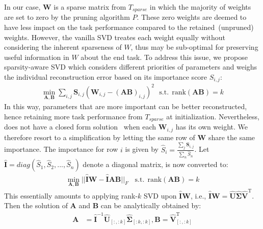 In our case, $\bm{W}$ is a sparse matrix from $T_{sparse}$ in which the majority of weights are set to zero by the pruning algorithm $P$. These zero weights are deemed to have less impact on the task performance compared to the retained~(unpruned) weights. However, the vanilla SVD treates each weight equally without considering the inherent sparseness of $W$, thus may be sub-optimal for preserving useful information in $W$ about the end task.
To address this issue, we propose sparsity-aware SVD which considers different priorities of parameters and weighs the individual reconstruction error based on its importance score $S_{i,j}$:
\begin{align}
	\min_{\bm{A},\bm{B}}\sum_{i,j}\bm{S}_{i,j}(\bm{W}_{i,j}-(\bm{AB})_{i,j})^2~~~\text{s.t.}~~\text{rank}(\bm{AB})=k
	\label{eq:sasvd}
\end{align}
In this way, parameters that are more important can be better reconstructed, hence retaining more task performance from $T_{sparse}$ at initialization. Nevertheless,  does not have a closed form solution~\cite{weightedsvd,hsu2021language} when each $\bm{W}_{i,j}$ has its own weight. We therefore resort to a simplification by letting the same row of $\bm{W}$ share the same importance. The importance for row $i$ is given by $\hat{S}_{i}=\frac{\sum_{j}\bm{S}_{i,j}}{\sum_{n}\hat{S}_{n}}$. Let $\hat{\bm{I}}=diag(\hat{S}_1,\hat{S}_2,...,\hat{S}_{n})$ denote a diagonal matrix,   is now converted to:
\begin{align}
	\min_{\bm{A},\bm{B}}||\hat{\bm{I}}\bm{W}-\hat{\bm{I}}\bm{A}\bm{B}||_F~~~~\text{s.t.}~~\text{rank}(\bm{AB})=k
\end{align}
This essentially amounts to applying rank-$k$ SVD upon $\hat{\bm{I}}\bm{W}$, i.e., $\hat{\bm{I}}\bm{W}=\hat{\bm{U}}\hat{\bm{\Sigma}}\hat{\bm{V}}^\mathrm{T}$. Then the solution of $\bm{A}$ and $\bm{B}$ can be analytically obtained by:
\begin{align}
	\bm{A} &= \hat{\bm{I}}^{-1}\hat{\bm{U}}_{[:,:k]}\hat{\bm{\Sigma}}_{[:k,:k]},\bm{B}=\hat{\bm{V}}_{[:,:k]}^{\mathrm{T}}
\end{align}


